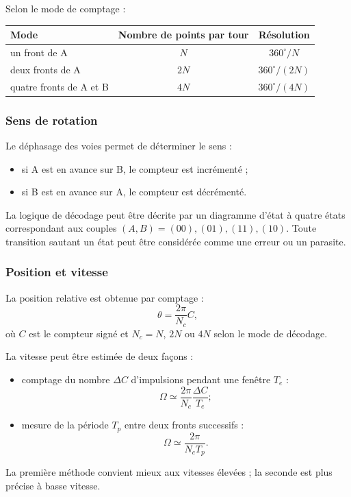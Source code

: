 Selon le mode de comptage :
\begin{center}
\small
\begin{tabular}{lcc}
\toprule
Mode & Nombre de points par tour & Résolution \\
\midrule
un front de A & $N$ & $360^\circ/N$\\
deux fronts de A & $2N$ & $360^\circ/(2N)$\\
quatre fronts de A et B & $4N$ & $360^\circ/(4N)$\\
\bottomrule
\end{tabular}
\end{center}

\subsubsection{Sens de rotation}

Le déphasage des voies permet de déterminer le sens :
\begin{itemize}
  \item si A est en avance sur B, le compteur est incrémenté ;
  \item si B est en avance sur A, le compteur est décrémenté.
\end{itemize}

\begin{center}\TLChronogrammeCodeur\end{center}

La logique de décodage peut être décrite par un diagramme d'état à quatre états correspondant aux couples $(A,B)=(00),(01),(11),(10)$. Toute transition sautant un état peut être considérée comme une erreur ou un parasite.

\subsubsection{Position et vitesse}

La position relative est obtenue par comptage :
\[
\boxed{\theta=\frac{2\pi}{N_c}C,}
\]
où $C$ est le compteur signé et $N_c=N$, $2N$ ou $4N$ selon le mode de décodage.

La vitesse peut être estimée de deux façons :
\begin{itemize}
  \item comptage du nombre $\Delta C$ d'impulsions pendant une fenêtre $T_e$ :
  \[
  \boxed{\Omega\simeq\frac{2\pi}{N_c}\frac{\Delta C}{T_e}};
  \]
  \item mesure de la période $T_p$ entre deux fronts successifs :
  \[
  \boxed{\Omega\simeq\frac{2\pi}{N_cT_p}}.
  \]
\end{itemize}
La première méthode convient mieux aux vitesses élevées ; la seconde est plus précise à basse vitesse.

